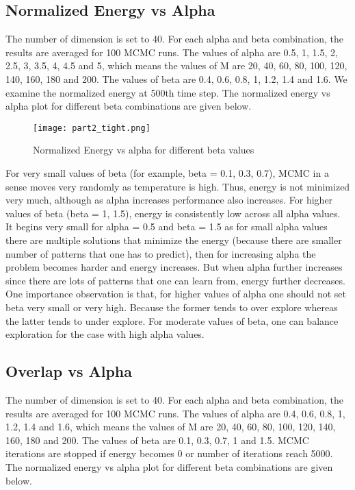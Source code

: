 \documentclass[a4paper]{article}
\begin{document}
\subsection{Normalized Energy vs Alpha}
The number of dimension is set to 40. For each alpha and beta combination, the results are averaged for 100 MCMC runs. The values of alpha are 0.5, 1, 1.5, 2, 2.5, 3, 3.5, 4, 4.5 and 5, which means the values of M are 20, 40, 60, 80, 100, 120, 140, 160, 180 and 200. The values of beta are 0.4, 0.6, 0.8, 1, 1.2, 1.4 and 1.6. We examine the normalized energy at 500th time step. The normalized energy vs alpha plot for different beta combinations are given below.

\begin{figure}[H]
\centering
\texttt{[image: part2\_tight.png]}
\caption{\label{fig:part2}Normalized Energy vs alpha for different beta values}
\end{figure}

For very small values of beta (for example, beta = 0.1, 0.3, 0.7), MCMC in a sense moves very randomly as temperature is high. Thus, energy is not minimized very much, although as alpha increases performance also increases. For higher values of beta (beta = 1, 1.5), energy is consistently low across all alpha values. It begins very small for alpha = 0.5 and beta = 1.5 as for small alpha values there are multiple solutions that minimize the energy (because there are smaller number of patterns that one has to predict), then for increasing alpha the problem becomes harder and energy increases. But when alpha further increases since there are lots of patterns that one can learn from, energy further decreases. One importance observation is that, for higher values of alpha one should not set beta very small or very high. Because the former tends to over explore whereas the latter tends to under explore. For moderate values of beta, one can balance exploration for the case with high alpha values.

\subsection{Overlap vs Alpha}
The number of dimension is set to 40. For each alpha and beta combination, the results are averaged for 100 MCMC runs. The values of alpha are 0.4, 0.6, 0.8, 1, 1.2, 1.4 and 1.6, which means the values of M are 20, 40, 60, 80, 100, 120, 140, 160, 180 and 200. The values of beta are 0.1, 0.3, 0.7, 1 and 1.5. MCMC iterations are stopped if energy becomes 0 or number of iterations reach 5000. The normalized energy vs alpha plot for different beta combinations are given below.
\end{document}
